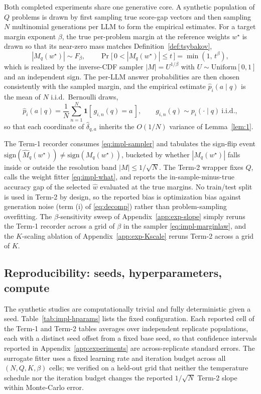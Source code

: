\documentclass{article} %
\providecommand{\dhat}{\widehat{\delta}}
\providecommand{\phat}{\widehat{p}}
\providecommand{\Mhat}{\widehat{M}}
\providecommand{\what}{\widehat{w}}
\providecommand{\wstar}{w^{\star}}
\providecommand{\sign}{\mathrm{sign}}
\begin{document}
Both completed experiments share one generative core.  A synthetic population
of $Q$ problems is drawn by first sampling true score-gap vectors and then
sampling $N$ multinomial generations per LLM to form the empirical estimates.
For a target margin exponent $\beta$, the true per-problem margin at the
reference weights $\wstar$ is drawn so that its near-zero mass matches
Definition~\ref{def:tsybakov},
\begin{equation}
\label{eq:impl-marginlaw}
|M_q(\wstar)| \sim F_\beta,
\qquad
\Pr\big[\,0<|M_q(\wstar)|\le t\,\big] = \min(1,\,t^{\beta}),
\end{equation}
which is realized by the inverse-CDF sampler $|M|=U^{1/\beta}$ with
$U\sim\mathrm{Uniform}[0,1]$ and an independent sign.  The per-LLM answer
probabilities are then chosen consistently with the sampled margin, and the
empirical estimate $\phat_i(a\mid q)$ is the mean of $N$ i.i.d.\ Bernoulli
draws,
\begin{equation}
\label{eq:impl-sampler}
\phat_i(a\mid q) = \frac1N\sum_{n=1}^N \mathbf 1[\,g_{i,n}(q)=a\,],
\qquad
g_{i,n}(q)\sim p_i(\cdot\mid q)\ \text{i.i.d.},
\end{equation}
so that each coordinate of $\dhat_{q,a}$ inherits the $O(1/N)$ variance of
Lemma~\ref{lem:1}.

The Term-1 recorder consumes \eqref{eq:impl-sampler} and tabulates the
sign-flip event $\sign(\Mhat_q(\wstar))\neq\sign(M_q(\wstar))$, bucketed by
whether $|M_q(\wstar)|$ falls inside or outside the resolution band
$|M|\le 1/\sqrt N$.  The Term-2 wrapper fixes $Q$, calls the weight fitter
\eqref{eq:impl-what}, and reports the in-sample-minus-true accuracy gap of the
selected $\what$ evaluated at the true margins.  No train/test split is used in
Term-2 by design, so the reported bias is optimization bias against
generation noise (term (i) of \eqref{eq:decomp}) rather than problem-sampling
overfitting.  The $\beta$-sensitivity sweep of Appendix~\ref{app:exp-slope}
simply reruns the Term-1 recorder across a grid of $\beta$ in the sampler
\eqref{eq:impl-marginlaw}, and the $K$-scaling ablation of
Appendix~\ref{app:exp-Kscale} reruns Term-2 across a grid of $K$.

\subsection{Reproducibility: seeds, hyperparameters, compute}
\label{app:impl-repro}

The synthetic studies are computationally trivial and fully deterministic given
a seed.  Table~\ref{tab:impl-hparams} lists the fixed configuration.  Each
reported cell of the Term-1 and Term-2 tables averages over independent
replicate populations, each with a distinct seed offset from a fixed base seed,
so that confidence intervals reported in Appendix~\ref{app:experiments} are
across-replicate standard errors.  The surrogate fitter uses a fixed learning
rate and iteration budget across all $(N,Q,K,\beta)$ cells; we verified on a
held-out grid that neither the temperature schedule nor the iteration budget
changes the reported $1/\sqrt N$ Term-2 slope within Monte-Carlo error.
\end{document}
